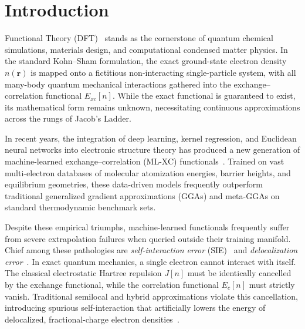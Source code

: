 \documentclass[journal]{IEEEtran}
\begin{document}
\section{Introduction}
 Functional Theory (DFT)~\cite{HK1964,KS1965} stands as the cornerstone of quantum chemical simulations, materials design, and computational condensed matter physics. In the standard Kohn--Sham formulation, the exact ground-state electron density $n(\mathbf{r})$ is mapped onto a fictitious non-interacting single-particle system, with all many-body quantum mechanical interactions gathered into the exchange--correlation functional $E_{xc}[n]$. While the exact functional is guaranteed to exist, its mathematical form remains unknown, necessitating continuous approximations across the rungs of Jacob's Ladder.

In recent years, the integration of deep learning, kernel regression, and Euclidean neural networks into electronic structure theory has produced a new generation of machine-learned exchange--correlation (ML-XC) functionals~\cite{CIDER2022,CIDER2026,Skala2025,e3nn}. Trained on vast multi-electron databases of molecular atomization energies, barrier heights, and equilibrium geometries, these data-driven models frequently outperform traditional generalized gradient approximations (GGAs) and meta-GGAs on standard thermodynamic benchmark sets.

Despite these empirical triumphs, machine-learned functionals frequently suffer from severe extrapolation failures when queried outside their training manifold. Chief among these pathologies are \emph{self-interaction error} (SIE)~\cite{PZ1981} and \emph{delocalization error}~\cite{CMSY2008,CMSY2012}. In exact quantum mechanics, a single electron cannot interact with itself. The classical electrostatic Hartree repulsion $J[n]$ must be identically cancelled by the exchange functional, while the correlation functional $E_c[n]$ must strictly vanish. Traditional semilocal and hybrid approximations violate this cancellation, introducing spurious self-interaction that artificially lowers the energy of delocalized, fractional-charge electron densities~\cite{PPLB1982}.
\end{document}
